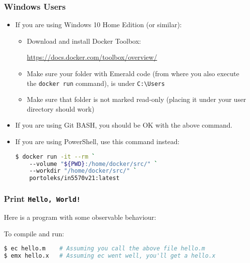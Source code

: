 \begin{frame}[fragile]

\frametitle{Windows Users}

\begin{itemize}

\item If you are using Windows 10 Home Edition (or similar):

\begin{itemize}

\item Download and install Docker Toolbox:

\url{https://docs.docker.com/toolbox/overview/}

\item Make sure your folder with Emerald code (from where you also
execute the \texttt{docker run} command), is under
\texttt{C:\textbackslash{}Users}

\item Make sure that folder is not marked read-only (placing it under
your user directory should work)

\end{itemize}

\item If you are using Git BASH, you should be OK with the above command.

\item If you are using PowerShell, use this command instead:

\vspace{-0.05in}

\begin{lstlisting}[language=bash]
$ docker run -it --rm `
    --volume "${PWD}:/home/docker/src/" `
    --workdir "/home/docker/src/" `
    portoleks/in5570v21:latest
\end{lstlisting}

\end{itemize}

\end{frame}

\begin{frame}[fragile]

\frametitle{Print \texttt{Hello, World!}}

Here is a program with some observable behaviour:


To compile and run:

\begin{lstlisting}[language=bash]
$ ec hello.m    # Assuming you call the above file hello.m
$ emx hello.x   # Assuming ec went well, you'll get a hello.x
\end{lstlisting}

\end{frame}


